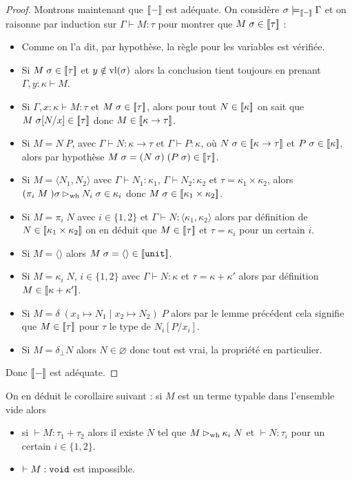 \begin{proof}
    Montrons maintenant que $[\![ - ]\!]$ est adéquate. On considère $\sigma\models_{[\![ - ]\!]}\Gamma$ et on raisonne par induction sur $\Gamma\vdash M : \tau$ pour montrer que $M\;\sigma\in[\![ \tau ]\!]$ :
    \begin{itemize}[label=$\bullet$]
        \item Comme on l'a dit, par hypothèse, la règle pour les variables est vérifiée.
        \item Si $M\;\sigma\in[\![ \tau ]\!]$ et $y\notin\mathrm{vl}(\sigma)$ alors la conclusion tient toujours en prenant $\Gamma,y : \kappa\vdash M$.
        \item Si $\Gamma,x : \kappa\vdash M : \tau$ et $M\;\sigma\in[\![ \tau ]\!]$, alors pour tout $N\in[\![ \kappa ]\!]$ on sait que $M\;\sigma[N/x]\in[\![ \tau ]\!]$ donc $M\in[\![ \kappa\to\tau ]\!]$.
        \item Si $M = N\;P$, avec $\Gamma\vdash N : \kappa\to\tau$ et $\Gamma\vdash P : \kappa$, où $N\;\sigma\in[\![ \kappa\to\tau ]\!]$ et $P\;\sigma\in[\![ \kappa ]\!]$, alors par hypothèse $M\;\sigma = (N\;\sigma)\;(P\;\sigma)\in[\![ \tau ]\!]$.
        \item Si $M = \langle N_1,N_2\rangle$ avec $\Gamma\vdash N_1 : \kappa_1$, $\Gamma\vdash N_2 : \kappa_2$ et $\tau = \kappa_1\times\kappa_2$, alors $(\pi_i\;M\;)\sigma \rhd_{\mathrm{wh}} N_i\;\sigma \in\kappa_i$ donc $M\;\sigma\in[\![ \kappa_1\times\kappa_2 ]\!]$.
        \item Si $M = \pi_i\;N$ avec $i\in\{1,2\}$ et $\Gamma\vdash N : \langle \kappa_1,\kappa_2\rangle$ alors par définition de $N\in[\![ \kappa_1\times\kappa_2 ]\!]$ on en déduit que $M \in[\![ \tau ]\!]$ et $\tau = \kappa_i$ pour un certain $i$.
        \item Si $M = \langle\rangle$ alors $M\;\sigma = \langle\rangle \in[\![ \texttt{unit} ]\!]$.
        \item Si $M = \kappa_i\;N$, $i\in\{1,2\}$ avec $\Gamma\vdash N : \kappa$ et $\tau = \kappa+\kappa'$ alors par définition $M\in[\![ \kappa+\kappa' ]\!]$.
        \item Si $M = \delta\;(x_1\mapsto N_1\mid x_2\mapsto N_2)\;P$ alors par le lemme précédent cela signifie que $M\in[\![ \tau ]\!]$ pour $\tau$ le type de $N_i[P/x_i]$.
        \item Si $M = \delta_\bot N$ alors $N\in\varnothing$ donc tout est vrai, la propriété en particulier.
    \end{itemize}
    Donc $[\![ - ]\!]$ est adéquate.
\end{proof}

\begin{cor}
    On en déduit le corollaire suivant : si $M$ est un terme typable dans l'ensemble vide alors 
    \begin{itemize}[label=$\bullet$]
        \item si $\vdash M : \tau_1+\tau_2$ alors il existe $N$ tel que $M\rhd_{\mathrm{wh}} \kappa_i\;N$ et $\vdash N : \tau_i$ pour un certain $i\in\{1,2\}$.
        \item $\vdash M : \texttt{void}$ est impossible.
    \end{itemize}
\end{cor}

